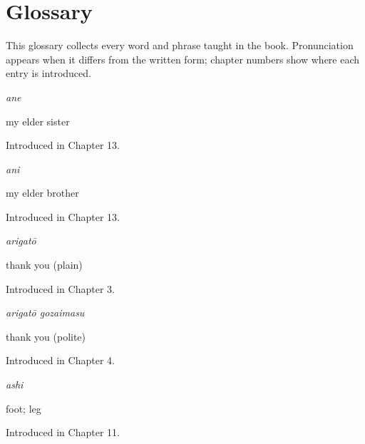 
\chapter*{Glossary}

This glossary collects every word and phrase taught in the book. Pronunciation appears when it differs from the written form; chapter numbers show where each entry is introduced.

\noindent\begin{minipage}[t]{\linewidth}
\raggedright
\textbf{}\enspace\emph{ane}\par
\small my elder sister\par
\footnotesize Introduced in Chapter 13.
\end{minipage}\par\medskip

\noindent\begin{minipage}[t]{\linewidth}
\raggedright
\textbf{}\enspace\emph{ani}\par
\small my elder brother\par
\footnotesize Introduced in Chapter 13.
\end{minipage}\par\medskip

\noindent\begin{minipage}[t]{\linewidth}
\raggedright
\textbf{}\enspace\emph{arigatō}\par
\small thank you (plain)\par
\footnotesize Introduced in Chapter 3.
\end{minipage}\par\medskip

\noindent\begin{minipage}[t]{\linewidth}
\raggedright
\textbf{}\enspace\emph{arigatō gozaimasu}\par
\small thank you (polite)\par
\footnotesize Introduced in Chapter 4.
\end{minipage}\par\medskip

\noindent\begin{minipage}[t]{\linewidth}
\raggedright
\textbf{}\enspace\emph{ashi}\par
\small foot; leg\par
\footnotesize Introduced in Chapter 11.
\end{minipage}\par\medskip

